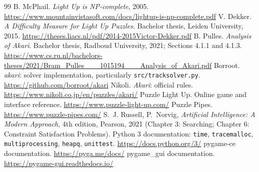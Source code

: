 \documentclass[12pt,a4paper]{article}
\newcommand{\code}[1]{\texttt{#1}}
\begin{document}
\clearpage
\begin{thebibliography}{99}
 B. McPhail. \emph{Light Up is NP-complete}, 2005.
\url{https://www.mountainvistasoft.com/docs/lightup-is-np-complete.pdf}
 V. Dekker. \emph{A Difficulty Measure for Light Up Puzzles}.
Bachelor thesis, Leiden University, 2015.
\url{https://theses.liacs.nl/pdf/2014-2015Victor-Dekker.pdf}
 B. Pulles. \emph{Analysis of Akari}.
Bachelor thesis, Radboud University, 2021; Sections 4.1.1 and 4.1.3.
\url{https://www.cs.ru.nl/bachelors-theses/2021/Bram_Pulles___1015194___Analysis_of_Akari.pdf}
 Borroot. \emph{akari}: solver implementation,
particularly \code{src/tracksolver.py}.
\url{https://github.com/borroot/akari}
 Nikoli. \emph{Akari}: official rules.
\url{https://www.nikoli.co.jp/en/puzzles/akari/}
 Puzzle Light Up. Online game and interface reference.
\url{https://www.puzzle-light-up.com/}
 Puzzle Pipes. \url{https://www.puzzle-pipes.com/}
 S.~J. Russell, P.~Norvig, \emph{Artificial Intelligence: A Modern
Approach}, 4th edition, Pearson, 2021 (Chapter 3: Searching; Chapter 6:
Constraint Satisfaction Problems).
 Python 3 documentation: \code{time}, \code{tracemalloc},
\code{multiprocessing}, \code{heapq}, \code{unittest}.
\url{https://docs.python.org/3/}
 pygame-ce documentation. \url{https://pyga.me/docs/}
\quad pygame\_gui documentation. \url{https://pygame-gui.readthedocs.io/}
\end{thebibliography}
\end{document}
